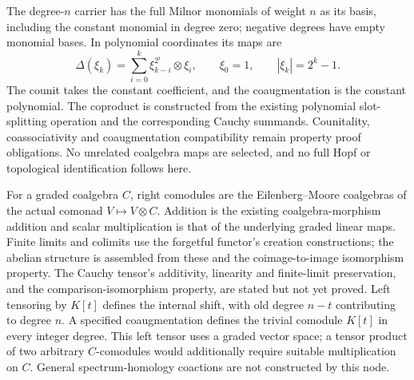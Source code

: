 \begin{definition}
  \label{def:fixed-milnor-graded-coalgebra}
  \notready
  The degree-$n$ carrier has the full Milnor monomials of weight $n$ as
  its basis, including the constant monomial in degree zero; negative
  degrees have empty monomial bases. In polynomial coordinates its maps are
  \[
    \Delta(\xi_k)=\sum_{i=0}^{k}\xi_{k-i}^{2^i}\otimes\xi_i,
    \qquad \xi_0=1,\qquad |\xi_k|=2^k-1.
  \]
  The counit takes the constant coefficient, and the coaugmentation is
  the constant polynomial. The coproduct is constructed from the existing
  polynomial slot-splitting operation and the corresponding Cauchy
  summands. Counitality, coassociativity and coaugmentation compatibility
  remain property proof obligations. No unrelated coalgebra maps are
  selected, and no full Hopf or topological identification follows here.
\end{definition}

\begin{definition}
  \label{def:actual-graded-right-comodules}
  \notready
  For a graded coalgebra $C$, right comodules are the Eilenberg--Moore
  coalgebras of the actual comonad $V\mapsto V\otimes C$.
  Addition is the existing coalgebra-morphism addition and scalar
  multiplication is that of the underlying graded linear maps.
  Finite limits and colimits use the forgetful functor's creation
  constructions; the abelian structure is assembled from these and the
  coimage-to-image isomorphism property. The Cauchy tensor's additivity,
  linearity and finite-limit preservation, and the comparison-isomorphism
  property, are stated but not yet proved.
  Left tensoring by $K[t]$ defines the internal shift, with old degree
  $n-t$ contributing to degree $n$. A specified coaugmentation defines
  the trivial comodule $K[t]$ in every integer degree. This left tensor
  uses a graded vector space; a tensor product of two arbitrary
  $C$-comodules would additionally require suitable multiplication on $C$.
  General spectrum-homology coactions are not constructed by this node.
\end{definition}


